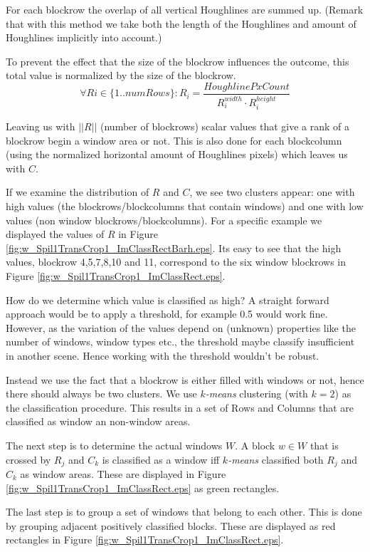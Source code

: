 For each blockrow the overlap of all vertical Houghlines are summed up.
(Remark that with this method we take both the length of the Houghlines and
amount of Houghlines implicitly into account.)

To prevent the effect that the size of the blockrow influences the outcome, this total value
is normalized by the size of the blockrow.
\[\forall Ri\in \{1..numRows\} : R_i = \frac{HoughlinePxCount}{R_i^{width} \cdot R_i^{height}}\]

Leaving us with $||R||$ (number of blockrows) scalar values that give a rank of a blockrow begin a window area or not.
This is also done for each blockcolumn (using the normalized horizontal amount of
Houghlines pixels) which leaves us with $C$.

If we examine the distribution of $R$ and $C$, we see two clusters appear: one with
high values (the blockrows/blockcolumns that contain windows) and one with low values (non window
blockrows/blockcolumns). For a specific example we displayed the values of $R$ in Figure \ref{fig:w_Spil1TransCrop1_ImClassRectBarh.eps}.
Its easy to see that the high values, blockrow 4,5,7,8,10 and 11, correspond to the
six window blockrows in Figure \ref{fig:w_Spil1TransCrop1_ImClassRect.eps}.

How do we determine which value is classified as high?  A straight forward
approach would be to apply a threshold, for example 0.5 would work fine.
However, as the variation of the values depend on (unknown) properties like the
number of windows, window types etc., the threshold maybe classify insufficient
in another scene.  Hence working with the threshold wouldn't be robust. 

Instead we use the fact that a blockrow is either filled with windows or not, hence
there should always be two clusters.  We use \emph{$k$-means} clustering (with
$k=2$) as the classification procedure.
This results in a set of Rows and Columns that are classified as window an
non-window areas.

The next step is to determine the actual windows $W$.
A block $w\in W$ that is crossed by $R_j$ and $C_k$ is classified as a
window iff \emph{$k$-means} classified both $R_j$ and $C_k$ as window areas. These are displayed in 
 Figure \ref{fig:w_Spil1TransCrop1_ImClassRect.eps} as green rectangles.

The last step is to group a set of windows that belong to each other. This is done by 
grouping adjacent positively classified blocks. These are displayed as red
rectangles in Figure \ref{fig:w_Spil1TransCrop1_ImClassRect.eps}.

